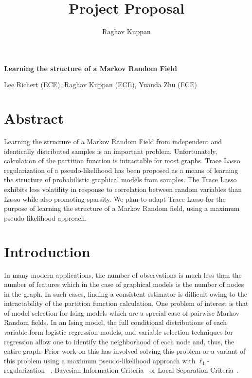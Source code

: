 \documentclass[11pt]{article}
\author{Raghav Kuppan}
\title{Project Proposal}
\begin{document}
\begin{center}
\textbf{\Large Learning the structure of a Markov Random Field}
\end{center}

\begin{center}
Lee Richert (ECE), Raghav Kuppan (ECE), Yuanda Zhu (ECE)
\end{center}



\section{Abstract}

Learning the structure of a Markov Random Field from independent and identically distributed samples is an important problem. Unfortunately, calculation of the partition function is intractable for most graphs. Trace Lasso regularization of a pseudo-likelihood has been proposed as a means of learning the structure of probabilistic graphical models from samples. The Trace Lasso exhibits less volatility in response to correlation between random variables than Lasso while also promoting sparsity. We plan to adapt Trace Lasso for the purpose of learning the structure of a Markov Random field, using a maximum pseudo-likelihood approach.

\section{Introduction}
In many modern applications, the number of observations is much less than the number of features which in the case of graphical models is the number of nodes in the graph. In such cases, finding a consistent estimator is difficult owing to the intractability of the partition function calculation. One problem of interest is that of model selection for Ising models which are a special case of pairwise Markov Random fields. In an Ising model, the full conditional distributions of each variable form logistic regression models, and variable selection techniques for regression allow one to identify the neighborhood of each node and, thus, the entire graph. Prior work on this has involved solving this problem or a variant of this problem using a maximum pseudo-likelihood approach with $\ell_1$-regularization ~\cite{ravikumar2010high}, Bayesian Information Criteria~\cite{barber2015high} or Local Separation Criteria~\cite{anandkumar2012high}.\\
\end{document}
